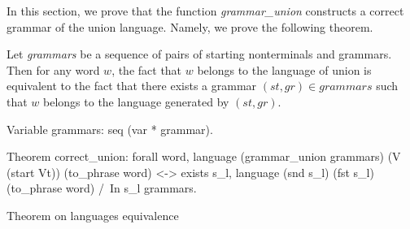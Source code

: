 In this section, we prove that the function \textit{grammar\_union} constructs a correct grammar of the union language. Namely, we prove the following theorem.

\begin{theorem} \label{theorem-correct-union}
    Let \textit{grammars} be a sequence of pairs of starting nonterminals and grammars. Then for any word $w$, the fact that $w$ belongs to the language of union is equivalent to the fact that there exists a grammar $(st,gr) \in \textit{grammars}$ such that $w$ belongs to the language generated by $(st,gr)$.
\end{theorem}

\begin{listing}[h]
    \begin{pyglist}[language=coq, numbers=none, numbersep=5pt]
  Variable grammars: seq (var * grammar).

  Theorem correct_union:
    forall word, 
      language (grammar_union grammars) 
        (V (start Vt)) (to_phrase word) <->
      exists s_l, 
        language (snd s_l) (fst s_l) 
          (to_phrase word) /\ 
        In s_l grammars.
    \end{pyglist}
    \caption{Theorem on languages equivalence}
    \label{lst:lang-eq}
\end{listing}


